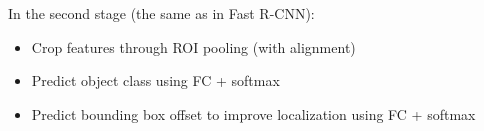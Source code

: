 In the second stage (the same as in Fast R-CNN):
\begin{itemize}
    \item Crop features through ROI pooling (with alignment)
    \item Predict object class using FC + softmax
    \item Predict bounding box offset to improve localization using FC + softmax
\end{itemize}{}

